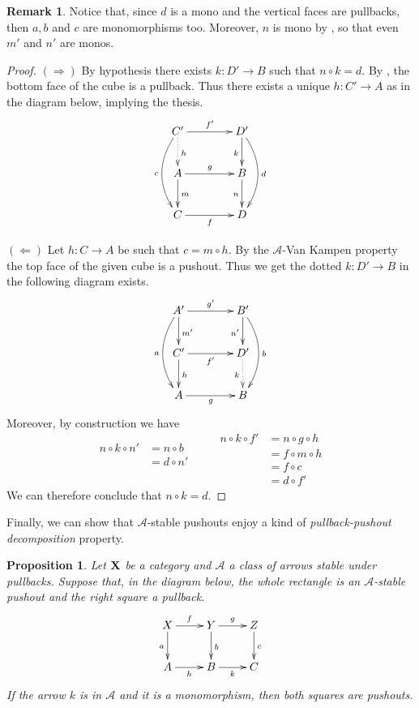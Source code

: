\documentclass[a4paper]{article}
\def\X{\textbf {\textup{X}}}
\newtheorem{proposition}[theorem]{Proposition}
\theoremstyle{definition}
\newtheorem{remark}[theorem]{Remark}
\begin{document}
\begin{remark}
	Notice that, since $d$ is a mono and the vertical faces are pullbacks, then $a, b$ and $c$ are monomorphisms too. Moreover, $n$ is mono by , so that even $m'$ and $n'$ are monos.
\end{remark}

\begin{proof}
	$(\Rightarrow)$ By hypothesis there exists $k:D'\to B$ such that $n\circ k = d$. By , the bottom face of the cube is a pullback. Thus there exists a unique $h:C'\to A$ as in the diagram below, implying the thesis.
		\[\xymatrix@C=40pt{C'  \ar@{.>}[d]^{h}\ar[r]^{f'} \ar@/_.5cm/[dd]_{c}& D' \ar@/^.5cm/[dd]^{d}\ar[d]_{k}\\ A \ar[d]^{m} \ar[r]^{g} & B \ar[d]_{n} \\  C \ar[r]_f & D}\]
	
	\smallskip \noindent 
	$(\Leftarrow)$ Let $h:C\to A$ be such that $c=m\circ h$. By the $\mathcal{A}$-Van Kampen property the top face of the given cube is a pushout. Thus we get  the dotted $k:D'\to B$ in the following diagram exists.
		\[\xymatrix@C=40pt{A' \ar@/_.5cm/[dd]_{a} \ar[d]^{m'} \ar[r]^{g'} & B' \ar[d]_{n'} \ar@/^.5cm/[dd]^{b} \\  C' \ar[d]^{h} \ar[r]_{f'} & D' \ar@{.>}[d]_{k}\\ A \ar[r]_g& B }\]
Moreover, by construction we have
\[\begin{split}
n\circ k \circ n' &= n\circ b\\&=d\circ n'\\&\\&
\end{split} \qquad \begin{split}
n\circ k \circ f' &= n\circ g\circ h\\&=f\circ m\circ h\\&=f\circ c\\&= d\circ f' \end{split}\]
We can therefore conclude that $n\circ k =d$. \qedhere 
\end{proof}

Finally, we can show that $\mathcal{A}$-stable pushouts enjoy a kind of \emph{pullback-pushout decomposition} property.

\begin{proposition}\label{prop:stab}Let $\X$ be a category and $\mathcal{A}$ a class of arrows stable under pullbacks. Suppose that, in the diagram below, the whole rectangle is an $\mathcal{A}$-stable pushout and the right square a pullback.
	\[\xymatrix{X \ar[d]_{a} \ar[r]^{f}& \ar[r]^{g} Y \ar[d]^{b}& Z \ar[d]^{c}\\ A \ar[r]_{h}& B \ar[r]_{k}& C}\]
	If the arrow $k$ is in $\mathcal{A}$ and it is a monomorphism,  then both squares are pushouts.
\end{proposition}
\end{document}
